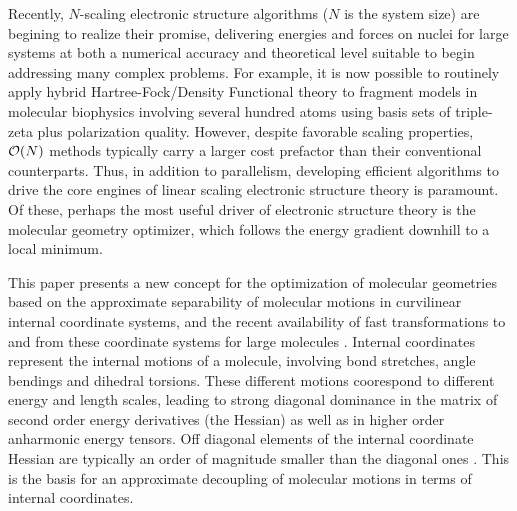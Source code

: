 \documentclass[prl,aps,preprint,showpacs,superbib]{revtex4}
\begin{document}
Recently, $N$-scaling electronic structure algorithms ($N$ is the system size)  are begining to 
realize their promise, delivering energies and forces on nuclei for large systems at 
both a numerical accuracy and theoretical level suitable to begin addressing many complex 
problems.  For example, it is now possible to routinely apply hybrid Hartree-Fock/Density 
Functional theory to fragment models in molecular biophysics involving 
several hundred atoms using basis sets of triple-zeta plus polarization quality.  
However, despite favorable scaling properties, ${\cal O}(N)$ 
methods typically carry a larger cost prefactor than their conventional counterparts.  Thus, 
in addition to parallelism, developing efficient algorithms to drive the core engines of 
linear scaling electronic structure theory is paramount.  Of these, perhaps the most useful 
driver of electronic structure theory is the molecular geometry optimizer, which follows 
the energy gradient downhill to a local minimum.   

This paper presents a new concept for the optimization of molecular geometries based on
the approximate separability of molecular motions in curvilinear internal coordinate 
systems, and the recent availability of fast transformations to and from these coordinate systems 
for large molecules \cite{paizs_coordtrf1,nemeth_coordtrf1,paizs_coordtrf2,nemeth_coordtrf2}.  
Internal coordinates represent the internal motions of a molecule, involving  bond stretches, angle 
bendings and dihedral torsions.  These different motions coorespond to different  energy and length 
scales, leading to strong diagonal dominance in the matrix of second order energy derivatives 
(the Hessian) as well as in higher order anharmonic energy tensors.  Off diagonal elements of the 
internal coordinate Hessian are typically an order of magnitude smaller than the diagonal ones
\cite{pulay_69,fogarasi_diaghess,Pulay_natural_internals,pulay_review,pulay_dynamics}.
This is the basis for an approximate decoupling of molecular motions in terms of internal coordinates.
\end{document}
